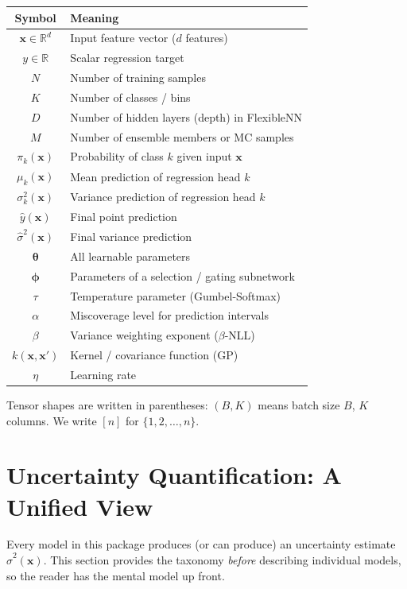 \documentclass[11pt,a4paper]{article}
\theoremstyle{definition}
\newcommand{\R}{\mathbb{R}}
\newcommand{\bx}{\mathbf{x}}
\newcommand{\btheta}{\boldsymbol{\theta}}
\newcommand{\bphi}{\boldsymbol{\phi}}
\begin{document}
\begin{center}
\begin{tabular}{cl}
\toprule
Symbol & Meaning \\
\midrule
$\bx \in \R^d$ & Input feature vector ($d$ features) \\
$y \in \R$ & Scalar regression target \\
$N$ & Number of training samples \\
$K$ & Number of classes / bins \\
$D$ & Number of hidden layers (depth) in FlexibleNN \\
$M$ & Number of ensemble members or MC samples \\
$\pi_k(\bx)$ & Probability of class $k$ given input $\bx$ \\
$\mu_k(\bx)$ & Mean prediction of regression head $k$ \\
$\sigma_k^2(\bx)$ & Variance prediction of regression head $k$ \\
$\hat{y}(\bx)$ & Final point prediction \\
$\hat{\sigma}^2(\bx)$ & Final variance prediction \\
$\btheta$ & All learnable parameters \\
$\bphi$ & Parameters of a selection / gating subnetwork \\
$\tau$ & Temperature parameter (Gumbel-Softmax) \\
$\alpha$ & Miscoverage level for prediction intervals \\
$\beta$ & Variance weighting exponent ($\beta$-NLL) \\
$k(\bx, \bx')$ & Kernel / covariance function (GP) \\
$\eta$ & Learning rate \\
\bottomrule
\end{tabular}
\end{center}

Tensor shapes are written in parentheses: $(B, K)$ means batch size $B$, $K$
columns. We write $[n]$ for $\{1, 2, \ldots, n\}$.

\section{Uncertainty Quantification: A Unified View}
\label{sec:uq}

Every model in this package produces (or can produce) an uncertainty estimate
$\hat{\sigma}^2(\bx)$. This section provides the taxonomy \emph{before}
describing individual models, so the reader has the mental model up front.
\end{document}
